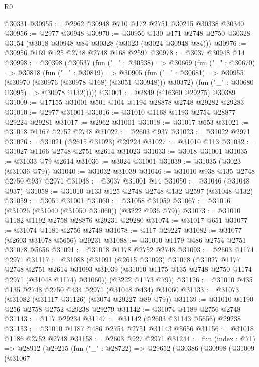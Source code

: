 \begin{lexlean}{R0}
\begin{coremodule}
    @30331
@30955 := @2962 @30948 @710 @172 @2751 @30215 @30338 @30340
@30956 := @2977 @30948
@30970 := @30956
    @130
    @171
    @2748
    @2750
    @30328
    @3154
    (@3018 @30948 @84 @30328 (@3023 (@3024 @30948 @84)))
@30976 := @30956 @169 @125 @2748 @2748 @168 @2597
@30978 := @3037 @30948 @14
@30998 := @30398
    (@30537
      (fun ("_" : @30538) =>
      @30669
        (fun ("_" : @30670) =>
        @30818
          (fun ("_" : @30819) =>
          @30905
            (fun ("_" : @30681) => @30955 (@30970 (@30976 (@30978 @168) (@3051 @30948))) @30372)
            (fun ("_" : @30680 @3095) => @30978 @132)))))
@31001 := @2849 (@16360 @29275) @30389
@31009 := @17155 @31001 @501 @104 @1194 @28878 @2748 @29282 @29283
@31010 := @2977 @31001
@31016 := @31010 @1168 @1193 @2754 @28877 @29224 @29281
@31017 := @2962 @31001
@31018 := @31017 @653
@31021 := @31018 @1167 @2752 @2748
@31022 := @2603 @937
@31023 := @31022 @2971
@31026 := @31021 (@2615 @31023) @29224
@31027 := @31010 @113
@31032 := @31027 @1166 @2748 @2751 @2614 @31023
@31033 := @3018 @31001
@31035 := @31033 @79 @2614
@31036 := @3024 @31001
@31039 := @31035 (@3023 (@31036 @79))
@31040 := @31032 @31039
@31046 := @31010 @938 @135 @2748 @2750 @937 @2971
@31048 := @3037 @31001 @14
@31050 := @31046 (@31048 @937)
@31058 := @31010 @133 @125 @2748 @2748 @132 @2597 (@31048 @132)
@31059 := @3051 @31001
@31060 := @31058 @31059
@31067 := @31016 (@31026 (@31040 (@31050 @31060)) (@3222 @936 @79))
@31073 := @31010 @1182 @1192 @2758 @28876 @29231 @29280
@31074 := @31017 @651
@31077 := @31074 @1181 @2756 @2748
@31078 := @117 @29227
@31082 := @31077 (@2603 @31078 @5656) @29231
@31088 := @31010 @1179 @486 @2754 @2751 @31078 @5656
@31091 := @31018 @1178 @2752 @2748
@31093 := @2603 @1174 @2971
@31117 := @31088
    (@31091
      (@2615 @31093)
      @31078
      (@31027
        @1177
        @2748
        @2751
        @2614
        @31093
        @31039
        (@31010 @1175 @135 @2748 @2750 @1174 @2971 (@31048 @1174) @31060))
      (@3222 @1173 @79))
@31126 := @31010 @435 @135 @2748 @2750 @434 @2971 (@31048 @434) @31060
@31133 := @31073 (@31082 (@31117 @31126) (@3074 @29227 @89 @79))
@31139 := @31010 @1190 @256 @2758 @2752 @29238 @29279
@31142 := @31074 @1189 @2756 @2748
@31143 := @117 @29234
@31147 := @31142 (@2603 @31143 @5656) @29238
@31153 := @31010 @1187 @486 @2754 @2751 @31143 @5656
@31156 := @31018 @1186 @2752 @2748
@31158 := @2603 @927 @2971
@31244 := fun (index : @71) =>
  @28912
    (@29215
      (fun ("_" : @28722) =>
      @29652
        (@30386
          (@30998
            (@31009
              (@31067

\end{coremodule}
\end{lexlean}

